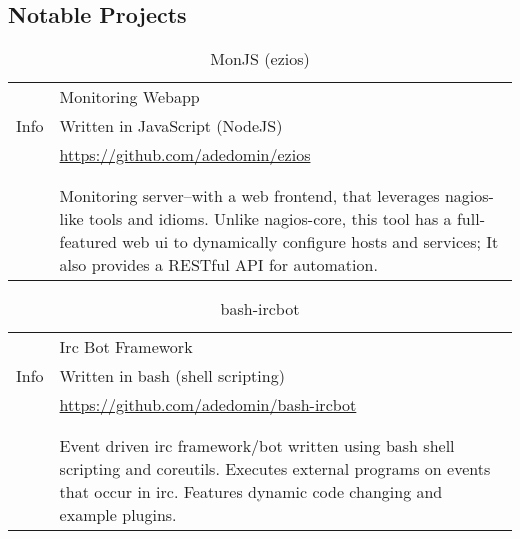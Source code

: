 \documentclass[letterpaper,]{article}
\begin{document}
\subsection{Notable Projects}\label{projects}

\begin{table}[H]
\centering
    \caption{MonJS (ezios)}
    \begin{tabularx}{\textwidth}{r|X}
        \multirow{3}{*}{Info} & Monitoring Webapp \\
                              & Written in JavaScript (NodeJS) \\
                              & \href{https://github.com/adedomin/ezios}{https://github.com/adedomin/ezios} \\
        & \\
        \begin{tabular}{@{}l@{}}
            Description \\
        \end{tabular}
        & Monitoring server--with a web frontend, that leverages nagios-like 
        tools and idioms. Unlike nagios-core, this tool has a full-featured 
        web ui to dynamically configure hosts and services; It also provides
        a RESTful API for automation.
    \end{tabularx}
\end{table}

\begin{table}[H]
\centering
    \caption{bash-ircbot}
    \begin{tabularx}{\textwidth}{r|X}
        \multirow{3}{*}{Info} & Irc Bot Framework \\
                              & Written in bash (shell scripting) \\
                              & \href{https://github.com/adedomin/bash-ircbot}{https://github.com/adedomin/bash-ircbot} \\
        & \\
        \begin{tabular}{@{}l@{}}
            Description \\
        \end{tabular}
        & Event driven irc framework/bot 
        written using bash shell scripting and coreutils.
        Executes external programs on events that occur in irc.
        Features dynamic code changing and example plugins. 
    \end{tabularx}
\end{table}
\end{document}
